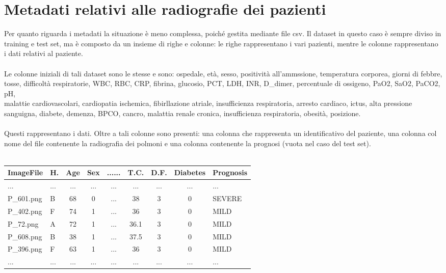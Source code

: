 \section{Metadati relativi alle radiografie dei pazienti}
Per quanto riguarda i metadati la situazione è meno complessa, poiché gestita mediante file csv.
Il dataset in questo caso è sempre diviso in training e test set, ma è composto da un insieme di righe e colonne:
le righe rappresentano i vari pazienti, mentre le colonne rappresentano i dati relativi al paziente.
\\\\
 \label{eterogeneo}Le colonne iniziali di tali dataset sono le stesse e sono: 
    ospedale,
    età,
    sesso, 
    positività all'ammssione, 
    temperatura corporea,
    giorni di febbre, 
    tosse,
    difficoltà respiratorie,
    WBC,
    RBC,
    CRP,
    fibrina, 
    glucosio, 
    PCT, 
    LDH, 
    INR, 
    D\_dimer, 
    percentuale di ossigeno, 
    PaO2, 
    SaO2, 
    PaCO2, 
    pH, 
    \\malattie cardiovascolari,
    cardiopatia ischemica,
    fibirllazione atriale,
    insufficienza respiratoria,
    arresto cardiaco,
    ictus,
    alta pressione sanguigna,
    diabete,
    demenza,
    BPCO,
    cancro,
    malattia renale cronica,
    insufficienza respiratoria,
    obesità,
    posizione.
\\\\
Questi rappresentano i dati. Oltre a tali colonne sono presenti: una colonna che rappresenta un identificativo del paziente, una colonna col nome 
del file contenente la radiografia dei polmoni e una colonna contenente la prognosi (vuota nel caso del test set).
\\\\
\begin{tcolorbox}[tab2,tabularx={Y|Y|Y|Y|Y|Y|Y|Y|Y|Y},title=Estratto del dataset di training,width=\textwidth, center=\textwidth]
    \centering
    \begin{tabular}{l|l|c|c|c|c|c|c|l}
        ImageFile & H. & Age & Sex & ...... & T.C. & D.F. & Diabetes & Prognosis \\ \hline \hline
        ... & ... & ... & ... & ... & ... & ... & ... & ... \\
        P\_601.png & B & 68 & 0 &...& 38 & 3 & 0 & SEVERE \\
        
        P\_402.png & F & 74 & 1 &...& 36 & 3 & 0 & MILD \\
        
        P\_72.png & A & 72 & 1 &...& 36.1 & 3 & 0 & MILD  \\
        
        P\_608.png & B & 38 & 1 &...& 37.5 & 3 & 0 & MILD  \\
        
        P\_396.png & F & 63 & 1 &...& 36 & 3 & 0 & MILD \\
        ... & ... & ... & ... & ... & ... & ... & ... & ... 
    \end{tabular}     
\end{tcolorbox}
